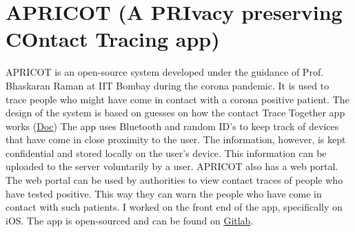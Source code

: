 \documentclass[12pt, conference, a4paper]{article}
\begin{document}
\section{APRICOT (A PRIvacy preserving COntact Tracing app)}
\label{SEC: 3}
APRICOT is an open-source system developed under the guidance of Prof. Bhaskaran Raman at IIT Bombay during the corona pandemic.  It is used to trace people who might have come in contact with a corona positive patient. The design of the system is based on guesses on how the contact Trace Together app works (\href{https://iitb-apricot.github.io/apricot-info/}{Doc})
The app uses Bluetooth and random ID’s to keep track of devices that have come in close proximity to the user. The information, however, is kept confidential and stored locally on the user’s device. This information can be uploaded to the server voluntarily by a user. APRICOT also has a web portal. The web portal can be used by authorities to view contact traces of people who have tested positive. This way they can warn the people who have come in contact with such patients.
I worked on the front end of the app, specifically on iOS. The app is open-sourced and can be found on \href{https://gitlab.com/hshahrukh/contact-tracing-ios}{Gitlab}.
\end{document}
